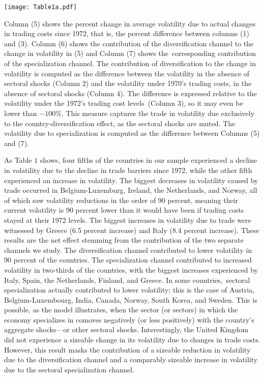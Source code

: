 \documentclass[12pt]{article}
\begin{document}
\begin{table}[h]
\caption{Baseline and counterfactual changes in volatility (measured as
variance) due to changes in trading costs. Baseline calibration ($\protect%
\theta =4$)}\centering\texttt{[image: Table1a.pdf]}
\end{table}

Column (5) shows the percent change in average volatility due to actual
changes in trading costs since 1972, that is, the percent difference between
columns (1) and (3). Column (6) shows the contribution of the
diversification channel to the change in volatility in (5) and Column (7)
shows the\ corresponding contribution of the specialization channel. The
contribution of diversification to the change in volatility is computed as
the difference between the volatility in the absence of sectoral shocks
(Column 2) and the volatility under 1970's trading costs, in the absence of
sectoral shocks (Column 4). The difference is expressed relative to the
volatility under the 1972's trading cost levels\ (Column 3), so it may even be lower than $-100\%$. 
This measure
captures the trade in volatility due exclusively to the
country-diversification effect, as the sectoral shocks are muted. The
volatility due to specialization is computed as the difference between
Columns (5) and (7).

As Table $1$ shows, four fifths of the countries in our sample experienced a
decline in volatility due to the decline in trade barriers since 1972, while
the other fifth experienced an increase in volatility. The biggest decreases
in volatility caused by trade occurred in Belgium-Luxemburg, Ireland, the
Netherlands, and Norway, all of which saw volatility reductions in the order
of 90 percent, meaning their current volatility is 90 percent lower than it
would have been if trading costs stayed at their 1972 levels. The biggest
increases in volatility due to trade were witnessed by Greece (6.5 percent
increase) and Italy (8.4 percent increase). These results are the net effect
stemming from the contribution of the two separate channels we study. The
diversification channel contributed to lower volatility in 90 percent of the
countries. The specialization channel contributed to increased volatility in
two-thirds of the countries, with the biggest increases experienced by
Italy, Spain, the Netherlands, Finland, and Greece. In some countries,\
sectoral specialization actually contributed to lower volatility; this is
the case of Austria, Belgium-Luxembourg, India, Canada, Norway, South Korea,
and Sweden. This is possible, as the model illustrates, when the sector (or
sectors) in which the economy specializes in comoves negatively (or less
positively) with the country's aggregate shocks---or other sectoral shocks.
Interestingly, the United Kingdom did not experience a sizeable change in
its volatility due to changes in trade costs. However, this result masks the
contribution of a sizeable reduction in volatility due to the
diversification channel and a comparably sizeable increase in volatility due
to the sectoral specialization channel.
\end{document}
